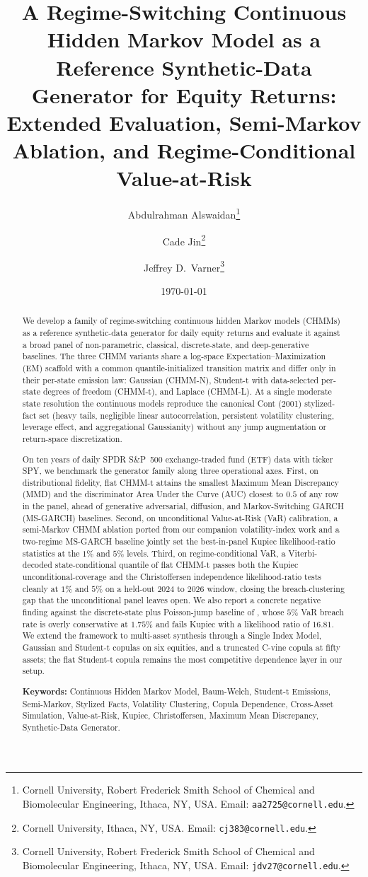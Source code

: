 \documentclass[11pt,a4paper]{article}
\title{A Regime-Switching Continuous Hidden Markov Model as a Reference Synthetic-Data Generator for Equity Returns:\\Extended Evaluation, Semi-Markov Ablation, and Regime-Conditional Value-at-Risk}
\author{
    Abdulrahman Alswaidan\thanks{Cornell University, Robert Frederick Smith School of Chemical and Biomolecular Engineering, Ithaca, NY, USA. Email: \texttt{aa2725@cornell.edu}.}
    \and
    Cade Jin\thanks{Cornell University, Ithaca, NY, USA. Email: \texttt{cj383@cornell.edu}.}
    \and
    Jeffrey D.\ Varner\thanks{Cornell University, Robert Frederick Smith School of Chemical and Biomolecular Engineering, Ithaca, NY, USA. Email: \texttt{jdv27@cornell.edu}.}
}
\date{\today}
\begin{document}
\maketitle

\begin{abstract}
We develop a family of regime-switching continuous hidden Markov models (CHMMs) as a reference synthetic-data generator for daily equity returns and evaluate it against a broad panel of non-parametric, classical, discrete-state, and deep-generative baselines.
The three CHMM variants share a log-space Expectation--Maximization (EM) scaffold with a common quantile-initialized transition matrix and differ only in their per-state emission law: Gaussian (CHMM-N), Student-t with data-selected per-state degrees of freedom (CHMM-t), and Laplace (CHMM-L).
At a single moderate state resolution the continuous models reproduce the canonical Cont (2001) stylized-fact set (heavy tails, negligible linear autocorrelation, persistent volatility clustering, leverage effect, and aggregational Gaussianity) without any jump augmentation or return-space discretization.

On ten years of daily SPDR S\&P~500 exchange-traded fund (ETF) data with ticker SPY, we benchmark the generator family along three operational axes.
First, on distributional fidelity, flat CHMM-t attains the smallest Maximum Mean Discrepancy (MMD) and the discriminator Area Under the Curve (AUC) closest to $0.5$ of any row in the panel, ahead of generative adversarial, diffusion, and Markov-Switching GARCH (MS-GARCH) baselines.
Second, on unconditional Value-at-Risk (VaR) calibration, a semi-Markov CHMM ablation ported from our companion volatility-index work and a two-regime MS-GARCH baseline jointly set the best-in-panel Kupiec likelihood-ratio statistics at the $1\%$ and $5\%$ levels.
Third, on regime-conditional VaR, a Viterbi-decoded state-conditional quantile of flat CHMM-t passes both the Kupiec unconditional-coverage and the Christoffersen independence likelihood-ratio tests cleanly at $1\%$ and $5\%$ on a held-out $2024$ to $2026$ window, closing the breach-clustering gap that the unconditional panel leaves open.
We also report a concrete negative finding against the discrete-state plus Poisson-jump baseline of \citet{alswaidan2026hybrid}, whose $5\%$ VaR breach rate is overly conservative at $1.75\%$ and fails Kupiec with a likelihood ratio of $16.81$.
We extend the framework to multi-asset synthesis through a Single Index Model, Gaussian and Student-t copulas on six equities, and a truncated C-vine copula at fifty assets; the flat Student-t copula remains the most competitive dependence layer in our setup.

\bigskip\noindent
\textbf{Keywords:} Continuous Hidden Markov Model, Baum-Welch, Student-t Emissions, Semi-Markov, Stylized Facts, Volatility Clustering, Copula Dependence, Cross-Asset Simulation, Value-at-Risk, Kupiec, Christoffersen, Maximum Mean Discrepancy, Synthetic-Data Generator.
\end{abstract}
\end{document}
